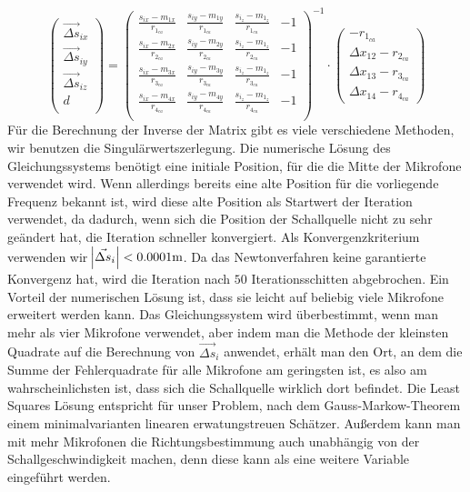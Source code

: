 $$
\begin{pmatrix}
\vec{\Delta{s}}_{ix} \\
\vec{\Delta{s}}_{iy} \\
\vec{\Delta{s}}_{iz} \\
                d \\
\end{pmatrix}
=
{\begin{pmatrix}
\frac{s_{ix} - m_{1x}}{r_{1_{ca}}} & \frac{s_{iy} - m_{1y}}{r_{1_{ca}}} & \frac{s_{i_z} - m_{1_z}}{r_{1_{ca}}} & -1 \\
\frac{s_{ix} - m_{2x}}{r_{2_{ca}}} & \frac{s_{iy} - m_{2y}}{r_{2_{ca}}} & \frac{s_{i_z} - m_{1_z}}{r_{2_{ca}}} & -1 \\
\frac{s_{ix} - m_{3x}}{r_{3_{ca}}} & \frac{s_{iy} - m_{3y}}{r_{3_{ca}}} & \frac{s_{i_z} - m_{1_z}}{r_{3_{ca}}} & -1 \\
\frac{s_{ix} - m_{4x}}{r_{4_{ca}}} & \frac{s_{iy} - m_{4y}}{r_{4_{ca}}} & \frac{s_{i_z} - m_{1_z}}{r_{4_{ca}}} & -1 \\
\end{pmatrix}}^{-1}
\cdot
\begin{pmatrix}
-r_{1_{ca}}\\

\Delta{x_{12}} - r_{2_{ca}}\\
\Delta{x_{13}} - r_{3_{ca}}\\
\Delta{x_{14}} - r_{4_{ca}}
\end{pmatrix}
$$
Für die Berechnung der Inverse der Matrix gibt es viele verschiedene Methoden, wir benutzen die Singulärwertszerlegung. Die numerische Lösung des Gleichungssystems benötigt eine initiale Position, für die die Mitte der Mikrofone verwendet wird. Wenn allerdings bereits eine alte Position für die vorliegende Frequenz bekannt ist, wird diese alte Position als Startwert der Iteration verwendet, da dadurch, wenn sich die Position der Schallquelle nicht zu sehr geändert hat, die Iteration schneller konvergiert. Als Konvergenzkriterium verwenden wir $\abs{\vec{\Delta{s}}_i} < 0.0001\mathrm{m}$. Da das Newtonverfahren keine garantierte Konvergenz hat, wird die Iteration nach $50$ Iterationsschitten abgebrochen.
Ein Vorteil der numerischen Lösung ist, dass sie leicht auf beliebig viele Mikrofone erweitert werden kann. Das Gleichungssystem wird überbestimmt, wenn man mehr als vier Mikrofone verwendet, aber indem man die Methode der kleinsten Quadrate auf die Berechnung von $\vec{\Delta{s}}_i$ anwendet, erhält man den Ort, an dem die Summe der Fehlerquadrate für alle Mikrofone am geringsten ist, es also am wahrscheinlichsten ist, dass sich die Schallquelle wirklich dort befindet. Die Least Squares Lösung entspricht für unser Problem, nach dem Gauss-Markow-Theorem einem minimalvarianten linearen erwatungstreuen Schätzer. Außerdem kann man mit mehr Mikrofonen die Richtungsbestimmung auch unabhängig von der Schallgeschwindigkeit machen, denn diese kann als eine weitere Variable eingeführt werden.

